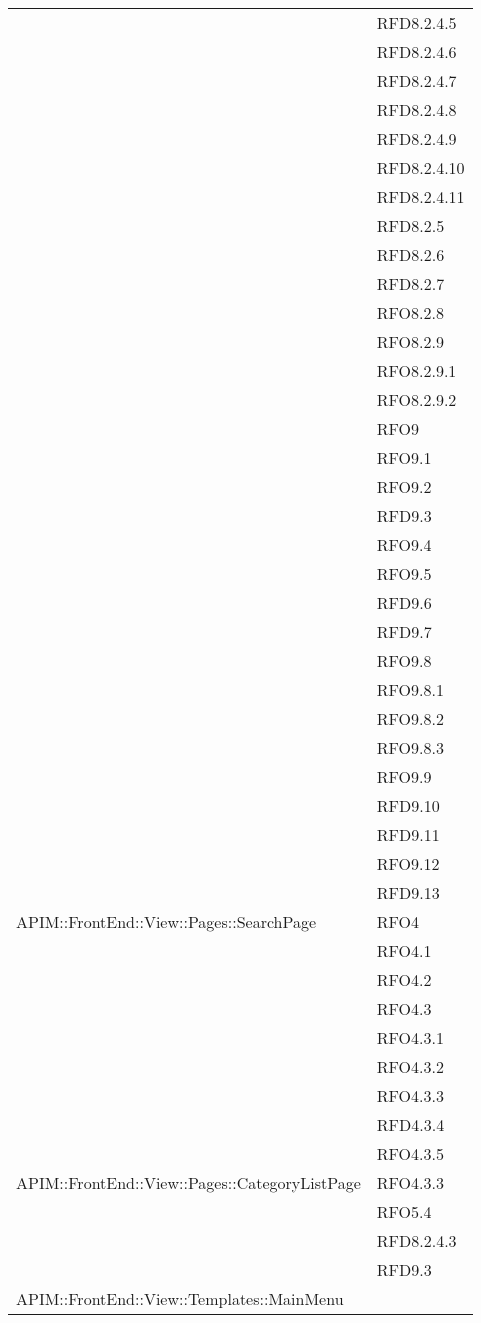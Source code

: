 \begin{longtable}{ p{12cm} | p{4cm} }
			&RFD8.2.4.5\\
			&RFD8.2.4.6\\
			&RFD8.2.4.7\\
			&RFD8.2.4.8\\
			&RFD8.2.4.9\\
			&RFD8.2.4.10\\
			&RFD8.2.4.11\\
			&RFD8.2.5\\
			&RFD8.2.6\\
			&RFD8.2.7\\
			&RFO8.2.8\\
			&RFO8.2.9\\
			&RFO8.2.9.1\\
			&RFO8.2.9.2\\
			&RFO9\\
			&RFO9.1\\
			&RFO9.2\\
			&RFD9.3\\
			&RFO9.4\\
			&RFO9.5\\
			&RFD9.6\\
			&RFD9.7\\
			&RFO9.8\\
			&RFO9.8.1\\
			&RFO9.8.2\\
			&RFO9.8.3\\
			&RFO9.9\\
			&RFD9.10\\
			&RFD9.11\\
			&RFO9.12\\
			&RFD9.13\\
			\hline
		    APIM::FrontEnd::View::Pages::SearchPage
		    &RFO4\\
		    &RFO4.1\\
		    &RFO4.2\\
		    &RFO4.3\\
		    &RFO4.3.1\\
		    &RFO4.3.2\\
		    &RFO4.3.3\\
		    &RFD4.3.4\\
		    &RFO4.3.5\\
		    \hline
		    APIM::FrontEnd::View::Pages::CategoryListPage
		    & RFO4.3.3 \\
		    & RFO5.4 \\
		    & RFD8.2.4.3 \\
		    & RFD9.3 \\
		    \hline
		    APIM::FrontEnd::View::Templates::MainMenu

\end{longtable}
